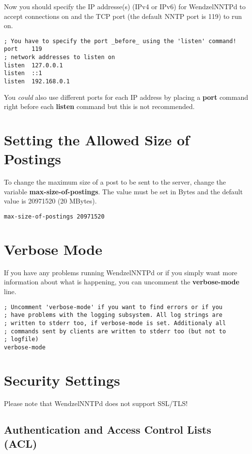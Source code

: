 Now you should specify the IP addresse(s) (IPv4 or IPv6) for WendzelNNTPd to accept connections on and the TCP port (the default NNTP port is 119) to run on.

\begin{verbatim}
; You have to specify the port _before_ using the 'listen' command!
port	119
; network addresses to listen on
listen	127.0.0.1
listen	::1
listen	192.168.0.1
\end{verbatim}

You {\it could} also use different ports for each IP address by placing a {\bf port} command right before each {\bf listen} command but this is not recommended.

\section{Setting the Allowed Size of Postings}

To change the maximum size of a post to be sent to the server, change the variable {\bf max-size-of-postings}. The value must be set in Bytes and the default value is 20971520 (20 MBytes).

\begin{verbatim}
max-size-of-postings 20971520
\end{verbatim}

\section{Verbose Mode}

If you have any problems running WendzelNNTPd or if you simply want more information about what is happening, you can uncomment the {\bf verbose-mode} line.

\begin{verbatim}
; Uncomment 'verbose-mode' if you want to find errors or if you
; have problems with the logging subsystem. All log strings are
; written to stderr too, if verbose-mode is set. Additionaly all
; commands sent by clients are written to stderr too (but not to
; logfile)
verbose-mode
\end{verbatim}

\section{Security Settings}

Please note that WendzelNNTPd does not support SSL/TLS!

\subsection{Authentication and Access Control Lists (ACL)}

